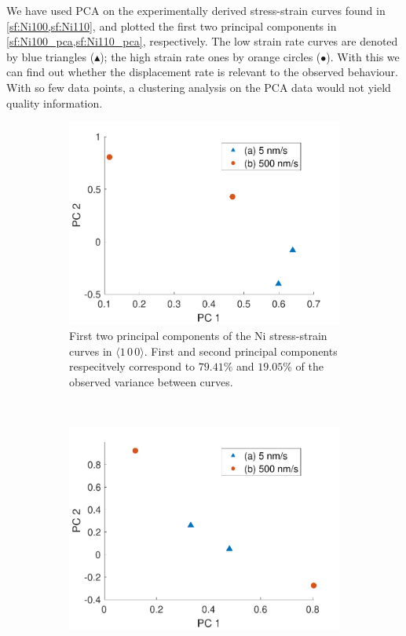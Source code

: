 We have used PCA on the experimentally derived stress-strain curves found in \cref{sf:Ni100,sf:Ni110}, and plotted the first two principal components in \cref{sf:Ni100_pca,sf:Ni110_pca}, respectively. The low strain rate curves are denoted by blue triangles (\textcolor{matlabBlue}{$\blacktriangle$}); the high strain rate ones by orange circles (\textcolor{matlabOrange}{$\bullet$}). With this we can find out whether the displacement rate is relevant to the observed behaviour. With so few data points, a clustering analysis on the PCA data would not yield quality information.
\begin{figure}
    \centering
    \begin{subfigure}[t]{0.45\linewidth}
        \centering
        \includegraphics[width=\linewidth]{../data/Ni100_pca.pdf}
        \caption[First two principal components of the Ni stress-strain curves in $\langle 1\,0\,0 \rangle$.]{First two principal components of the Ni stress-strain curves in $\langle 1\,0\,0 \rangle$. First and second principal components respecitvely correspond to $79.41\%$ and $19.05\%$ of the observed variance between curves.}
        \label{sf:Ni100_pca}
    \end{subfigure}
    ~
    \begin{subfigure}[t]{0.45\linewidth}
        \centering
        \includegraphics[width=\linewidth]{../data/Ni110_pca.pdf}

\end{subfigure}
\end{figure}
